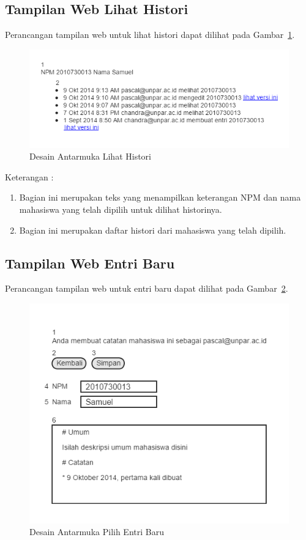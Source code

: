 \subsection{Tampilan Web Lihat Histori}
Perancangan tampilan web untuk lihat histori dapat dilihat pada Gambar~\ref{fig:lihathistori}.
\begin{figure}[H]
\centering
\includegraphics[scale=0.5]{Gambar/lihathistori.png}
\caption[Desain Antarmuka Lihat Histori]{Desain Antarmuka Lihat Histori}
\label{fig:lihathistori}
\end{figure}

Keterangan :
\begin{enumerate}[(1)]
\item
Bagian ini merupakan teks yang menampilkan keterangan NPM dan nama mahasiswa yang telah dipilih untuk dilihat historinya.
\item
Bagian ini merupakan daftar histori dari mahasiswa yang telah dipilih.
\end{enumerate}

\subsection{Tampilan Web Entri Baru}
Perancangan tampilan web untuk entri baru dapat dilihat pada Gambar~\ref{fig:entribaru}.
\begin{figure}[H]
\centering
\includegraphics[scale=0.5]{Gambar/entribaru.png}
\caption[Desain Antarmuka Entri Baru]{Desain Antarmuka Pilih Entri Baru}
\label{fig:entribaru}
\end{figure}

